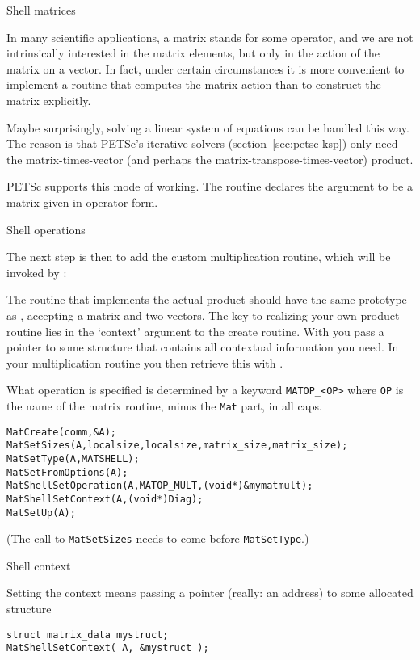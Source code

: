  {Shell matrices}
\label{sec:mat-shell}

In many scientific applications, a matrix stands for some operator,
and we are not intrinsically interested in the matrix elements, but
only in the action of the matrix on a vector. In fact, under certain
circumstances it is more convenient to implement a routine that
computes the matrix action than to construct the matrix explicitly.

Maybe surprisingly, solving a linear system of equations can be
handled this way. The reason is that PETSc's iterative solvers
(section~\ref{sec:petsc-ksp}) only need the matrix-times-vector (and perhaps
the matrix-transpose-times-vector) product.

PETSc supports this mode of working. The routine 
declares the argument to be a matrix given in operator form.

 {Shell operations}

The next step is then to add the custom multiplication routine, which
will be invoked by :
%

The routine that implements the actual product should have the same
prototype as , accepting a matrix and two
vectors. The key to realizing your own product routine lies in the
`context' argument to the create routine. With
 you pass a pointer to some
structure that contains all contextual information you need. In your
multiplication routine you then retrieve this with .

What operation is specified is determined by a keyword \lstinline+MATOP_<OP>+
where \lstinline{OP} is the name of the matrix routine, minus the \lstinline{Mat} part,
in all caps.

\begin{lstlisting}
MatCreate(comm,&A);
MatSetSizes(A,localsize,localsize,matrix_size,matrix_size);
MatSetType(A,MATSHELL);
MatSetFromOptions(A);
MatShellSetOperation(A,MATOP_MULT,(void*)&mymatmult);
MatShellSetContext(A,(void*)Diag);
MatSetUp(A);
\end{lstlisting}
(The call to \lstinline{MatSetSizes} needs to come before \lstinline{MatSetType}.)

 {Shell context}

Setting the context means passing a pointer (really: an address) to
some allocated structure
\begin{lstlisting}
struct matrix_data mystruct;
MatShellSetContext( A, &mystruct );
\end{lstlisting}

